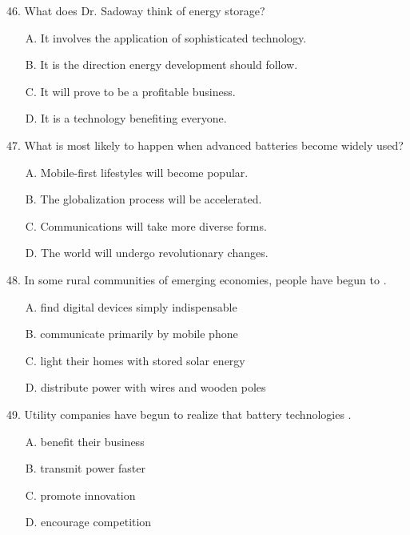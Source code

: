 \documentclass[UTF8,11pt]{ctexart}
\begin{document}
46. What does Dr. Sadoway think of energy storage?


\begin{itemize}[leftmargin=2em,itemsep=.2em,topsep=.4em]\item[A.] It involves the application of sophisticated technology.
\item[B.] It is the direction energy development should follow.
\item[C.] It will prove to be a profitable business.
\item[D.] It is a technology benefiting everyone.
\end{itemize}

47. What is most likely to happen when advanced batteries become widely used?


\begin{itemize}[leftmargin=2em,itemsep=.2em,topsep=.4em]\item[A.] Mobile-first lifestyles will become popular.
\item[B.] The globalization process will be accelerated.
\item[C.] Communications will take more diverse forms.
\item[D.] The world will undergo revolutionary changes.
\end{itemize}

48. In some rural communities of emerging economies, people have begun to .


\begin{itemize}[leftmargin=2em,itemsep=.2em,topsep=.4em]\item[A.] find digital devices simply indispensable
\item[B.] communicate primarily by mobile phone
\item[C.] light their homes with stored solar energy
\item[D.] distribute power with wires and wooden poles
\end{itemize}

49. Utility companies have begun to realize that battery technologies .


\begin{itemize}[leftmargin=2em,itemsep=.2em,topsep=.4em]\item[A.] benefit their business
\item[B.] transmit power faster
\item[C.] promote innovation
\item[D.] encourage competition
\end{itemize}
\end{document}
